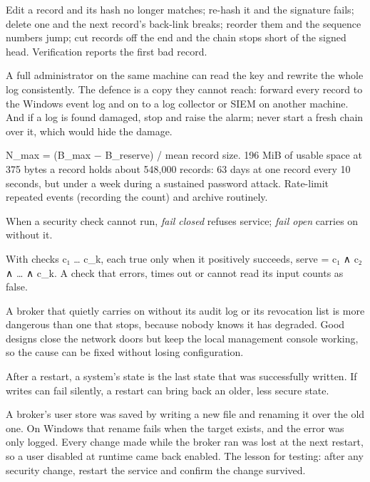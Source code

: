  Edit a record and its hash no longer matches; re-hash it and the signature fails; delete one and the next record's back-link breaks; reorder them and the sequence numbers jump; cut records off the end and the chain stops short of the signed head. Verification reports the first bad record.

 A full administrator on the same machine can read the key and rewrite the whole log consistently. The defence is a copy they cannot reach: forward every record to the Windows event log and on to a log collector or SIEM on another machine. And if a log is found damaged, stop and raise the alarm; never start a fresh chain over it, which would hide the damage.

 N\_max = (B\_max − B\_reserve) / mean record size. 196 MiB of usable space at 375 bytes a record holds about 548,000 records: 63 days at one record every 10 seconds, but under a week during a sustained password attack. Rate-limit repeated events (recording the count) and archive routinely.

 When a security check cannot run, \emph{fail closed} refuses service; \emph{fail open} carries on without it.

 With checks c₁ … c\_k, each true only when it positively succeeds, serve = c₁ ∧ c₂ ∧ … ∧ c\_k. A check that errors, times out or cannot read its input counts as false.

A broker that quietly carries on without its audit log or its revocation list is more dangerous than one that stops, because nobody knows it has degraded. Good designs close the network doors but keep the local management console working, so the cause can be fixed without losing configuration.

 After a restart, a system's state is the last state that was successfully written. If writes can fail silently, a restart can bring back an older, less secure state.

 A broker's user store was saved by writing a new file and renaming it over the old one. On Windows that rename fails when the target exists, and the error was only logged. Every change made while the broker ran was lost at the next restart, so a user disabled at runtime came back enabled. The lesson for testing: after any security change, restart the service and confirm the change survived.

